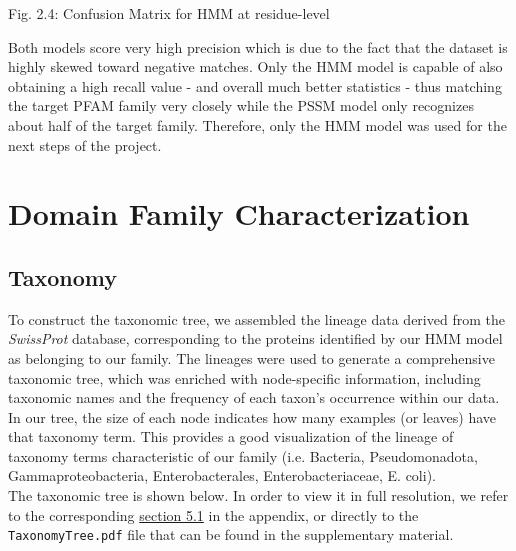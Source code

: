 \documentclass[10pt,twocolumn,letterpaper]{article}
\begin{document}
\begin{center}
    \small{Fig. 2.4: Confusion Matrix for HMM at residue-level}
\end{center}

Both models score very high precision which is due to the fact that the dataset is highly skewed toward negative matches. Only the HMM model is capable of also obtaining a high recall value - and overall much better statistics - thus matching the target PFAM family very closely while the PSSM model only recognizes about half of the target family. Therefore, only the HMM model was used for the next steps of the project.



\section{Domain Family Characterization}

\subsection{Taxonomy}

To construct the taxonomic tree, we assembled the lineage data derived from the \textit{SwissProt} database, corresponding to the proteins identified by our HMM model as belonging to our family. The lineages were used to generate a comprehensive taxonomic tree, which was enriched with node-specific information, including taxonomic names and the frequency of each taxon's occurrence within our data. In our tree, the size of each node indicates how many examples (or leaves) have that taxonomy term. This provides a good visualization of the lineage of taxonomy terms characteristic of our family (i.e. Bacteria, Pseudomonadota, Gammaproteobacteria, Enterobacterales, Enterobacteriaceae, E. coli). \\

The taxonomic tree is shown below. In order to view it in full resolution, we refer to the corresponding \hyperref[sec:taxtree]{section 5.1} in the appendix, or directly to the \texttt{TaxonomyTree.pdf} file that can be found in the supplementary material.
\end{document}
